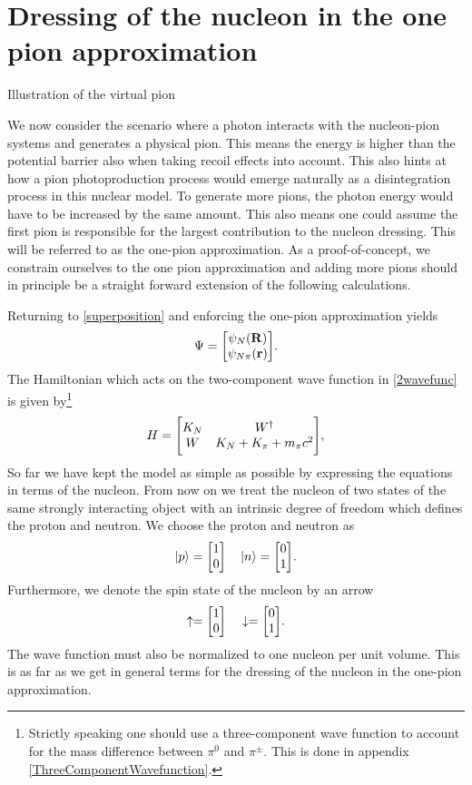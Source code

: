 \section{Dressing of the nucleon in the one pion approximation}\label{dressnuc}
\begin{marginfigure}
	\centering
	
	\caption{Illustration of the virtual pion}
	\label{fig:Underbarrier}
\end{marginfigure}
We now consider the scenario where a photon interacts with the nucleon-pion systems and generates a physical pion. This means the energy is higher than the potential barrier also when taking recoil effects into account. This also hints at how a pion photoproduction process would emerge naturally as a disintegration process in this nuclear model. To generate more pions, the photon energy would have to be increased by the same amount. This also means one could assume the first pion is responsible for the largest contribution to the nucleon dressing. This will be referred to as the one-pion approximation. As a proof-of-concept, we constrain ourselves to the one pion approximation and adding more pions should in principle be a straight forward extension of the following calculations.

Returning to \eqref{superposition} and enforcing the one-pion approximation yields
\begin{equation} \label{2wavefunc}
	\Psi = \mqty[\psi_{N}(\vec{R})\\
	\psi_{N\pi}(\vec{r})].
\end{equation}
The Hamiltonian which acts on the two-component wave function in \eqref{2wavefunc} is given by\footnote{Strictly speaking one should use a three-component wave function to account for the mass difference between $\pi^0$ and $\pi^\pm$. This is done in appendix \ref{ThreeComponentWavefunction}.}
\begin{equation}\label{HamilTwo}
	H  =  \mqty[K_N & W^\dagger \\ W & K_N+K_\pi+m_\pi c^2],
\end{equation}
So far we have kept the model as simple as possible by expressing the equations in terms of the nucleon. From now on we treat the nucleon of two states of the same strongly interacting object with an intrinsic degree of freedom which defines the proton and neutron. We choose the proton and neutron as 
\begin{equation} \label{isospinvec}
	\ket{p} = \mqty[1 \\ 0 ] \quad \ket{n} = \mqty[0 \\ 1].
\end{equation} 
Furthermore, we denote the spin state of the nucleon by an arrow
\begin{equation} \label{spinvec}
	\uparrow = \mqty[1 \\ 0 ] \quad  \downarrow= \mqty[0 \\ 1].
\end{equation}
The wave function must also be normalized to one nucleon per unit volume. This is as far as we get in general terms for the dressing of the nucleon in the one-pion approximation.
